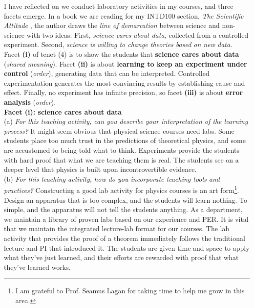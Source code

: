 \documentclass[../../../main.tex]{subfiles}
\begin{document}
I have reflected on we conduct laboratory activities in my courses, and three facets emerge.  In a book we are reading for my INTD100 section, \textit{The Scientific Attitude} \cite{scientific_attitude}, the author draws the \textit{line of demarcation} between science and non-science with two ideas.  First, \textit{science cares about data,} collected from a controlled experiment.  Second, \textit{science is willing to change theories based on new data.}  Facet \textbf{(i)} of tenet (4) is to show the students that \textbf{science cares about data} (\textit{shared meaning}).  Facet \textbf{(ii)} is about \textbf{learning to keep an experiment under control} (\textit{order}), generating data that can be interpreted.  Controlled experimentation generates the most convincing results by establishing cause and effect.  Finally, no experiment has infinite precision, so facet \textbf{(iii)} is about \textbf{error analysis} (\textit{order}).
\\
\vspace{0.15cm}
\textbf{Facet (i): science cares about data}
\\
\vspace{0.15cm}
(a) \textit{For this teaching activity, can you describe your interpretation of the learning process?}  It might seem obvious that physical science courses need labs.  Some students place too much trust in the predictions of theoretical physics, and some are accustomed to being told what to think.  Experiments provide the students with hard proof that what we are teaching them is real.  The students see on a deeper level that physics is built upon incontrovertible evidence.
\\
\vspace{0.15cm}
(b) \textit{For this teaching activity, how do you incorporate teaching tools and practices?}  Constructing a good lab activity for physics courses is an art form\footnote{I am grateful to Prof. Seamus Lagan for taking time to help me grow in this area.}.  Design an apparatus that is too complex, and the students will learn nothing.  To simple, and the apparatus will not tell the students anything.  As a department, we maintain a library of proven labs based on our experience and PER.  It is vital that we maintain the integrated lecture-lab format for our courses.  The lab activity that provides the proof of a theorem immediately follows the traditional lecture and PI that introduced it.  The students are given time and space to apply what they've just learned, and their efforts are rewarded with proof that what they've learned works.
\end{document}
